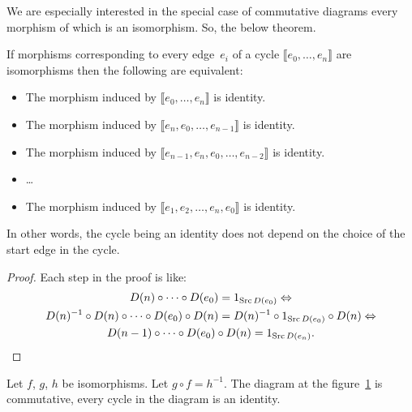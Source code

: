 We are especially interested in the special case of commutative diagrams
every morphism of which is an isomorphism. So, the below theorem.
\begin{thm}
\label{rehash-isos}If morphisms corresponding to every edge~$e_{i}$
of a cycle $\llbracket e_{0},\ldots,e_{n}\rrbracket$ are isomorphisms
then the following are equivalent:
\begin{itemize}
\item The morphism induced by $\llbracket e_{0},\ldots,e_{n}\rrbracket$
is identity.
\item The morphism induced by $\llbracket e_{n},e_{0},\ldots,e_{n-1}\rrbracket$
is identity.
\item The morphism induced by $\llbracket e_{n-1},e_{n},e_{0},\ldots,e_{n-2}\rrbracket$
is identity.
\item \ldots{}
\item The morphism induced by $\llbracket e_{1},e_{2},\ldots,e_{n},e_{0}\rrbracket$
is identity.
\end{itemize}
In other words, the cycle being an identity does not depend on the
choice of the start edge in the cycle.\end{thm}
\begin{proof}
Each step in the proof is like:
\begin{multline*}
D(n)\circ\dots\circ D(e_{0})=1_{\operatorname{Src} D(e_{0})}\Leftrightarrow\\
D(n)^{-1}\circ D(n)\circ\dots\circ D(e_{0})\circ D(n)=D(n)^{-1}\circ1_{\operatorname{Src} D(e_{0})}\circ D(n)\Leftrightarrow\\
D(n-1)\circ\dots\circ D(e_{0})\circ D(n)=1_{\operatorname{Src} D(e_{n})}.
\end{multline*}
\end{proof}
\begin{lem}
\label{three-loop-lem}Let $f$, $g$, $h$ be isomorphisms. Let $g\circ f=h^{-1}$.
The diagram at the figure~\ref{three-loop} is commutative, every
cycle in the diagram is an identity.

\begin{figure}[ht]
\caption{\label{three-loop}}
\end{figure}
\end{lem}

